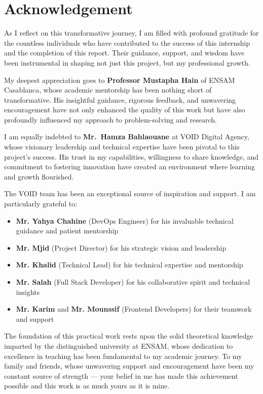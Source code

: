 \chapter*{Acknowledgement}
\thispagestyle{empty}

\indent As I reflect on this transformative journey, I am filled with profound gratitude for the countless individuals who have contributed to the success of this internship and the completion of this report. Their guidance, support, and wisdom have been instrumental in shaping not just this project, but my professional growth.

\bigskip

\indent My deepest appreciation goes to \textbf{Professor Mustapha Hain} of ENSAM Casablanca, whose academic mentorship has been nothing short of transformative. His insightful guidance, rigorous feedback, and unwavering encouragement have not only enhanced the quality of this work but have also profoundly influenced my approach to problem-solving and research.

\bigskip

\indent I am equally indebted to \textbf{Mr.~Hamza Bahlaouane} at VOID Digital Agency, whose visionary leadership and technical expertise have been pivotal to this project's success. His trust in my capabilities, willingness to share knowledge, and commitment to fostering innovation have created an environment where learning and growth flourished.

\bigskip

\indent The VOID team has been an exceptional source of inspiration and support. I am particularly grateful to:
\begin{itemize}
  \item \textbf{Mr. Yahya Chahine} (DevOps Engineer) for his invaluable technical guidance and patient mentorship
  \item \textbf{Mr. Mjid} (Project Director) for his strategic vision and leadership
  \item \textbf{Mr. Khalid} (Technical Lead) for his technical expertise and mentorship
  \item \textbf{Mr. Salah} (Full Stack Developer) for his collaborative spirit and technical insights
  \item \textbf{Mr. Karim} and \textbf{Mr. Mounssif} (Frontend Developers) for their teamwork and support
\end{itemize}

\bigskip

\indent The foundation of this practical work rests upon the solid theoretical knowledge imparted by the distinguished university at ENSAM, whose dedication to excellence in teaching has been fundamental to my academic journey. To my family and friends, whose unwavering support and encouragement have been my constant source of strength — your belief in me has made this achievement possible and this work is as much yours as it is mine.

\clearpage
